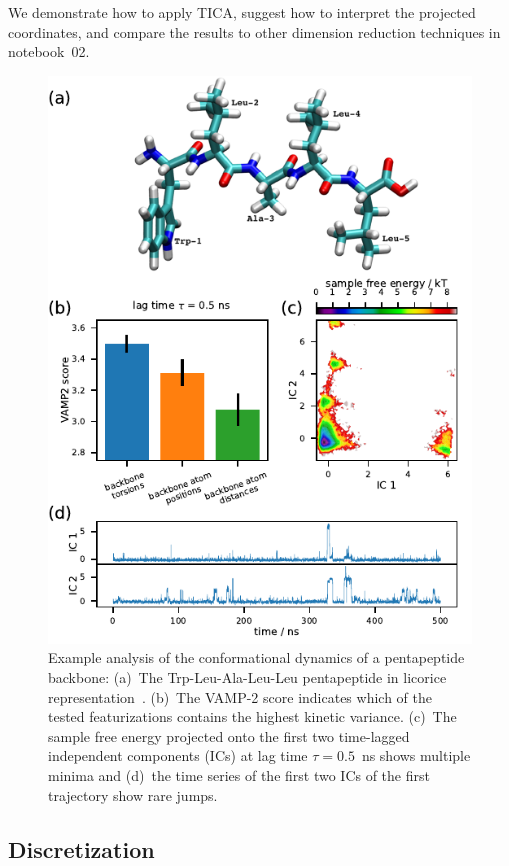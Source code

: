 \documentclass[9pt,tutorial]{livecoms}
\begin{document}
We demonstrate how to apply TICA, suggest how to interpret the projected coordinates, and compare the results to other dimension reduction techniques in notebook~02.

\begin{figure}
\includegraphics{figure_3}
\caption{Example analysis of the conformational dynamics of a pentapeptide backbone:
(a)~The Trp-Leu-Ala-Leu-Leu pentapeptide in licorice representation~\cite{vmd}.
(b)~The VAMP-2 score indicates which of the tested featurizations contains the highest kinetic variance.
(c)~The sample free energy projected onto the first two time-lagged independent components (ICs) at lag time $\tau=0.5$~ns shows multiple minima and
(d)~the time series of the first two ICs of the first trajectory show rare jumps.}
\label{fig:io-to-tica}
\end{figure}

\subsection{Discretization}
\end{document}
